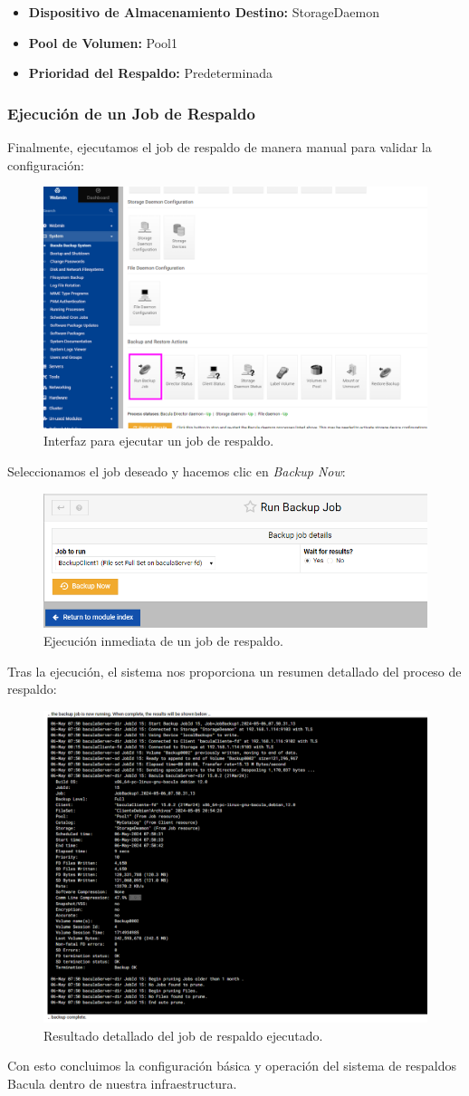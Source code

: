 \smallskip

\begin{itemize}
    \item \textbf{Dispositivo de Almacenamiento Destino:} StorageDaemon
    \item \textbf{Pool de Volumen:} Pool1
    \item \textbf{Prioridad del Respaldo:} Predeterminada
\end{itemize}






\subsubsection{Ejecución de un Job de Respaldo}

Finalmente, ejecutamos el job de respaldo de manera manual para validar la configuración:

\begin{figure}[H]
    \centering
    \includegraphics[width=0.5\linewidth]{instalacionBacula/runbackupjonbb.png}
    \caption{Interfaz para ejecutar un job de respaldo.}
\end{figure}

Seleccionamos el job deseado y hacemos clic en \textit{Backup Now}:

\begin{figure}[H]
    \centering
    \includegraphics[width=0.5\linewidth]{instalacionBacula/backupnoww.png}
    \caption{Ejecución inmediata de un job de respaldo.}
\end{figure}

Tras la ejecución, el sistema nos proporciona un resumen detallado del proceso de respaldo:

\begin{figure}[H]
    \centering
    \includegraphics[width=0.5\linewidth]{instalacionBacula/salidajob1.png}
    \caption{Resultado detallado del job de respaldo ejecutado.}
\end{figure}

Con esto concluimos la configuración básica y operación del sistema de respaldos Bacula dentro de nuestra infraestructura.
